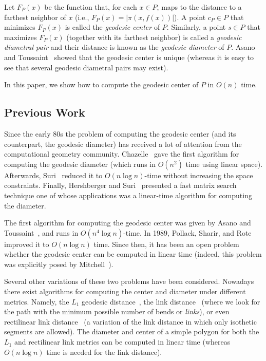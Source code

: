 \documentclass[a4paper,UKenglish]{lipics}
\newcommand{\F}[2]{\ensuremath{F_{\scriptscriptstyle #1}(#2)}}
\newcommand{\ff}[1]{\ensuremath{f(#1)}}
\newcommand{\cp}{\ensuremath{c_P}}
\newcommand{\g}[2]{\ensuremath{|\pi(#1, #2)|}}
\begin{document}
Let $\F{P}{x}$ be the function that, for each $x\in P$, maps to the distance to a farthest neighbor of $x$ (i.e., $\F{P}{x} = \g{x}{\ff{x}}$).
A point $\cp\in P$ that minimizes $\F{P}{x}$ is called the \emph{geodesic center} of $P$. Similarly, a point $s\in P$ that maximizes $\F{P}{x}$ (together with its farthest neighbor) is called a \emph{geodesic diametral pair} and their distance is known as the \emph{geodesic diameter} of $P$. Asano and Toussaint~\cite{at-cgcsp-85} showed that the geodesic center is unique (whereas it is easy to see that several geodesic diametral pairs may exist).

In this paper, we show how to compute the geodesic center of $P$ in $O(n)$ time.

\subsection{Previous Work}
Since the early 80s the problem of computing the geodesic center (and its counterpart, the geodesic diameter) has received a lot of attention from the computational geometry community. Chazelle~\cite{c-tpca-82} gave the first algorithm for computing the geodesic diameter (which runs in $O(n^2)$ time using linear space). Afterwards, Suri~\cite{suri1989computing} reduced it to $O(n\log n)$-time without increasing the space constraints. Finally, Hershberger and Suri~\cite{hershberger1993matrix} presented a fast matrix search technique one of whose applications was a linear-time algorithm for computing the diameter.

The first algorithm for computing the geodesic center was given by Asano and Toussaint~\cite{at-cgcsp-85}, and runs in $O(n^4\log n)$-time. In 1989, Pollack, Sharir, and Rote~\cite{pollackComputingCenter} improved it to $O(n\log n)$ time. Since then, it has been an open problem whether the geodesic center can be
computed in linear time (indeed, this problem was explicitly posed by Mitchell~\cite[Chapter 27]{m-gspno-00}).

Several other variations of these two problems have been considered. Nowadays there exist algorithms for computing the center and diameter under different metrics. Namely, the $L_1$ geodesic distance~\cite{bkow-clgdcsplt-13},  the link distance~\cite{suri-mlpprp-87,k-ealdp-89,dls-aclcsp-92} (where we look for the path with the minimum possible number of bends or {\em links}), or even rectilinear link distance~\cite{ns-crldp-91,ns-oarlcrp-96} (a variation of the link distance in which only isothetic segments are allowed). The diameter and center of a simple polygon for both the $L_1$ and rectilinear link metrics can be computed in linear time (whereas $O(n\log n)$ time is needed for the link distance).
\end{document}
